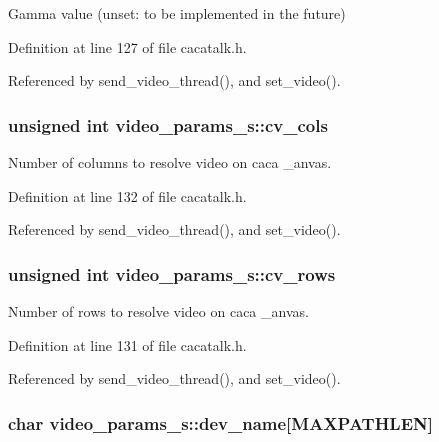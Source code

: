\-Gamma value (unset\-: to be implemented in the future) 



\-Definition at line 127 of file cacatalk.\-h.



\-Referenced by send\-\_\-video\-\_\-thread(), and set\-\_\-video().

\hypertarget{structvideo__params__s_aa3f695f161a6cc97cdbfbcc7405323ec}{
\subsubsection[{cv\-\_\-cols}]{\setlength{\rightskip}{0pt plus 5cm}unsigned int {\bf video\-\_\-params\-\_\-s\-::cv\-\_\-cols}}}\label{structvideo__params__s_aa3f695f161a6cc97cdbfbcc7405323ec}


\-Number of columns to resolve video on caca \-\_\-anvas. 



\-Definition at line 132 of file cacatalk.\-h.



\-Referenced by send\-\_\-video\-\_\-thread(), and set\-\_\-video().

\hypertarget{structvideo__params__s_aec78c2ac6a99bfb627d77fe7c533541d}{
\subsubsection[{cv\-\_\-rows}]{\setlength{\rightskip}{0pt plus 5cm}unsigned int {\bf video\-\_\-params\-\_\-s\-::cv\-\_\-rows}}}\label{structvideo__params__s_aec78c2ac6a99bfb627d77fe7c533541d}


\-Number of rows to resolve video on caca \-\_\-anvas. 



\-Definition at line 131 of file cacatalk.\-h.



\-Referenced by send\-\_\-video\-\_\-thread(), and set\-\_\-video().

\hypertarget{structvideo__params__s_a7c8bdb370066b647e33e0a84bbca5911}{
\subsubsection[{dev\-\_\-name}]{\setlength{\rightskip}{0pt plus 5cm}char {\bf video\-\_\-params\-\_\-s\-::dev\-\_\-name}\mbox{[}\-M\-A\-X\-P\-A\-T\-H\-L\-E\-N\mbox{]}}}\label{structvideo__params__s_a7c8bdb370066b647e33e0a84bbca5911}


